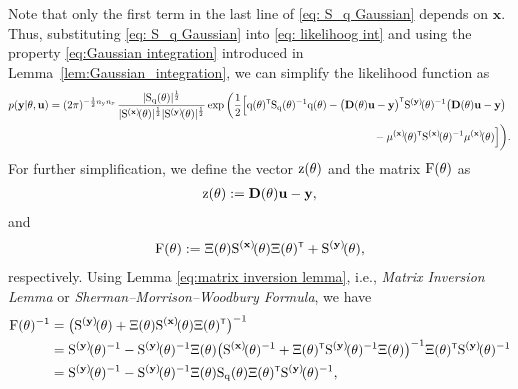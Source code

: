 Note that only the first term in the last line of \eqref{eq: S_q Gaussian} depends on $\mathbf{x}$.
Thus, substituting \eqref{eq: S_q Gaussian} into \eqref{eq: likelihoog int} and using the property \eqref{eq:Gaussian integration} introduced in Lemma~\ref{lem:Gaussian_integration}, we can simplify the likelihood function as
\begin{equation}\label{eq:likelihood integrated}
\begin{split}
     p(\mathbf{y}|\vctheta, \mathbf{u}) 
     = 
     (2\pi)^{-\frac{1}{2}\Ny\nsD}\,
     \frac{ |\Sqtheta|^{\frac{1}{2}}}
           {|\Sbfxtheta|^{\frac{1}{2}} |\Sbfytheta|^{\frac{1}{2}}} 
    \exp \bigg( &\frac{1}{2} \Big[ 
        \vcq(\vctheta)^\tr \Sqtheta^{-1} \vcq(\vctheta) 
        - 
        \big(\mathbf{D}(\vctheta)\mathbf{u} - \mathbf{y}\big)^\tr
        \Sbfytheta^{-1}
        \big(\mathbf{D}(\vctheta)\mathbf{u} - \mathbf{y}\big) 
     \\&\qquad \qquad \qquad \qquad \qquad \qquad \quad 
     - \mubfxtheta^\tr \Sbfxtheta^{-1} \mubfxtheta
     \Big] \bigg).
\end{split}
\end{equation}
For further simplification, we define the vector ${ \mathrm{z} }({ \mathrm{\theta} })$ and the matrix ${ \mathrm{F} }({ \mathrm{\theta} })$ as
\begin{align}\label{eqn:z_theta}
    { \mathrm{z} }({ \mathrm{\theta} }) := \mathbf{D}({ \mathrm{\theta} })\mathbf{u} - \mathbf{y},
\end{align}
and
\begin{align}
    \mxF(\vctheta) := \Xi(\vctheta)\Sbfxtheta\Xi(\vctheta)^\tr + \Sbfytheta,
\end{align}
respectively.
Using Lemma \eqref{eq:matrix inversion lemma}, i.e., 
\emph{Matrix Inversion Lemma} or \emph{Sherman--Morrison--Woodbury Formula},  
we have
\begin{align}
        \mxF(\vctheta) ^{-1}
        &= 
        \big(\Sbfytheta + \Xi(\vctheta)\Sbfxtheta\Xi(\vctheta)^\tr\big)^{-1} 
        \nonumber\\
        &= 
        \Sbfytheta^{-1} -\Sbfytheta^{-1}\Xi(\vctheta)
        \big(\Sbfxtheta^{-1} + \Xi(\vctheta)^\tr \Sbfytheta^{-1} \Xi(\vctheta)\big)^{-1}
        \Xi(\vctheta)^\tr\Sbfytheta^{-1} 
        \label{eq:F-1}\\
        &=
        \Sbfytheta^{-1} -\Sbfytheta^{-1}\Xi(\vctheta)
        \Sqtheta
        \Xi(\vctheta)^\tr\Sbfytheta^{-1},
        \nonumber
\end{align}
